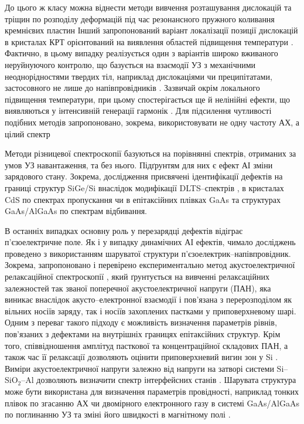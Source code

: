 До цього ж класу можна віднести методи вивчення розташування дислокацій та тріщин по розподілу деформацій під час резонансного пружного коливання кремнієвих пластин \cite{BELYAEV2001,OstapConf2,OstapConf3,Ostap:Method}
Інший запропонований варіант локалізації позиції дислокацій в кристалах КРТ орієнтований на виявлення областей підвищення температури \cite{savkina2004disl,SAVKINA2005disl}.
Фактично, в цьому випадку реалізується один з варіантів широко вживаного неруйнуючого контролю, що базується на взаємодії УЗ з механічними неоднорідностями твердих тіл, наприклад дислокаціями чи преципітатами, застосовного не лише до напівпровідників \cite{USM:NDEsteel}.
Зазвичай окрім локального підвищення температури, при цьому спостерігається ще й нелінійні ефекти, що виявляються у інтенсивній генерації гармонік \cite{USM:NDEsteel,USM:NDE}.
Для підсилення чутливості подібних методів запропоновано, зокрема, використовувати не одну частоту АХ, а цілий спектр  \cite{USM:NDE}

Методи різницевої спектроскопії базуються на порівнянні спектрів, отриманих за умов УЗ навантаження, та без нього.
Підґрунтям для них є ефект АІ зміни зарядового стану.
Зокрема, дослідження присвячені ідентифікації дефектів на границі структур SiGe/Si внаслідок модифікації DLTS--спектрів \cite{KorotchFTP1996},
в кристалах CdS по спектрах пропускання \cite{KorotFTT93}
чи в епітаксійних плівках GaAs \cite{KorotFTP1994,OSTROVSKII2000,Ostrovskii2001} та
структурах GaAs/AlGaAs \cite{SST:USmethod} по спектрам відбивання.

В останніх випадках основну роль у перезарядці дефектів відіграє п'єзоелектричне поле.
Як і у випадку динамічних АІ ефектів, чимало досліджень проведено з використанням шаруватої структури п'єзоелектрик--напівпровідник.
Зокрема, запропоновано і перевірено експериментально метод акустоелектричної релаксаційної спектроскопії \cite{Saiko1993,OstrovPAN,OlikhSSC}, який ґрунтується на вивченні релаксаційних залежностей так званої
поперечної акустоелектричної напруги (ПАН), яка виникає внаслідок акусто--електронної взаємодії і пов'язана з перерозподілом як вільних носіїв заряду, так і носіїв захоплених пастками у приповерхневому шарі.
Одним з переваг такого підходу є можливість визначення параметрів рівнів, пов'язаних з дефектами на внутрішніх границях епітаксійних структур.
Крім того,
співвідношення амплітуд пасткової та концентраційної складових ПАН, а також час її релаксації дозволяють оцінити
приповерхневий вигин  зон у Si \cite{PANnew}.
Виміри акустоелектричної напруги залежно від напруги на затворі системи  Si--SiO$_2$--Al дозволяють визначити спектр інтерфейсних станів \cite{USM:Nss}.
Шарувата структура може бути використана для визначення параметрів провідності, наприклад тонких плівок по згасанню АХ \cite{USM:provid} чи двомірного електронного газу в системі  GaAs/AlGaAs по поглинанню УЗ та зміні його швидкості в магнітному полі \cite{PhysRevB83:235318}.







